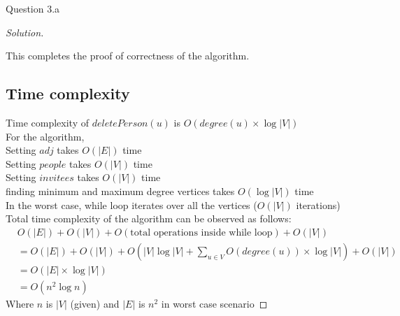 \begin{solution}{Question 3.a}
\begin{proof}[Solution]
\begin{enumerate}
        \end{enumerate}
        This completes the proof of correctness of the algorithm.
        
        \subsection*{Time complexity}
        Time complexity of $deletePerson(u)$ is $O(degree(u)\times \log|V|)$ \\
        For the algorithm,\\
        Setting $adj$ takes $O(|E|)$ time\\
        Setting $people$ takes $O(|V|)$ time\\
        Setting $invitees$ takes $O(|V|)$ time\\
        finding minimum and maximum degree vertices takes $O(\log|V|)$ time\\
        In the worst case, while loop iterates over all the vertices ($O(|V|)$ iterations)\\
        Total time complexity of the algorithm can be observed as follows:
        \begin{equation}
            \begin{split}
                &O(|E|)+O(|V|)+ O(\text{total operations inside while loop})+O(|V|)\\
                &=O(|E|)+O(|V|)+ O(|V|\log|V|+\sum_{u\in V}O(degree(u))\times \log|V|)+O(|V|)\\
                &=O(|E|\times \log|V|)\\
                &=O(n^2\log n)
            \end{split}
        \end{equation}
        Where $n$ is $|V|$ (given)
        and $|E|$ is $n^2$ in worst case scenario
        
    \end{proof}
\end{solution}


